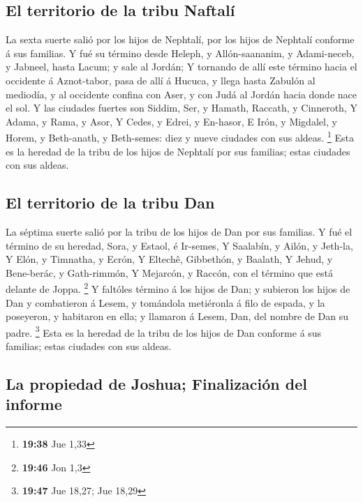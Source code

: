 \hypertarget{el-territorio-de-la-tribu-naftaluxed}{%
\subsection{El territorio de la tribu
Naftalí}\label{el-territorio-de-la-tribu-naftaluxed}}

 La sexta suerte salió por los hijos de Nephtalí, por los
hijos de Nephtalí conforme á sus familias.  Y fué su
término desde Heleph, y Allón-saananim, y Adami-neceb, y Jabneel, hasta
Lacum; y sale al Jordán;  Y tornando de allí este término
hacia el occidente á Aznot-tabor, pasa de allí á Hucuca, y llega hasta
Zabulón al mediodía, y al occidente confina con Aser, y con Judá al
Jordán hacia donde nace el sol.  Y las ciudades fuertes
son Siddim, Ser, y Hamath, Raccath, y Cinneroth,  Y
Adama, y Rama, y Asor,  Y Cedes, y Edrei, y En-hasor,
 E Irón, y Migdalel, y Horem, y Beth-anath, y Beth-semes:
diez y nueve ciudades con sus aldeas. \footnote{\textbf{19:38} Jue 1,33}
 Esta es la heredad de la tribu de los hijos de Nephtalí
por sus familias; estas ciudades con sus aldeas.

\hypertarget{el-territorio-de-la-tribu-dan}{%
\subsection{El territorio de la tribu
Dan}\label{el-territorio-de-la-tribu-dan}}

 La séptima suerte salió por la tribu de los hijos de Dan
por sus familias.  Y fué el término de su heredad, Sora,
y Estaol, é Ir-semes,  Y Saalabín, y Ailón, y Jeth-la,
 Y Elón, y Timnatha, y Ecrón,  Y Eltechê,
Gibbethón, y Baalath,  Y Jehud, y Bene-berác, y
Gath-rimmón,  Y Mejarcón, y Raccón, con el término que
está delante de Joppa. \footnote{\textbf{19:46} Jon 1,3} 
Y faltóles término á los hijos de Dan; y subieron los hijos de Dan y
combatieron á Lesem, y tomándola metiéronla á filo de espada, y la
poseyeron, y habitaron en ella; y llamaron á Lesem, Dan, del nombre de
Dan su padre. \footnote{\textbf{19:47} Jue 18,27; Jue 18,29}
 Esta es la heredad de la tribu de los hijos de Dan
conforme á sus familias; estas ciudades con sus aldeas.

\hypertarget{la-propiedad-de-joshua-finalizaciuxf3n-del-informe}{%
\subsection{La propiedad de Joshua; Finalización del
informe}\label{la-propiedad-de-joshua-finalizaciuxf3n-del-informe}}

